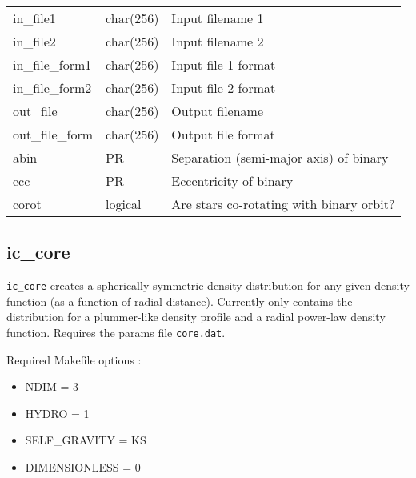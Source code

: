 \documentclass[a4paper]{article}
\newcommand{\var}[1]{\texttt{#1}}
\begin{document}
\tabletail{\hline}
\tablelasttail{\hline}
\begin{center}
\begin{supertabular}{|p{3cm}|p{2cm}|p{8cm}|}
in\_file1        & char(256) & Input filename 1 \\
in\_file2        & char(256) & Input filename 2 \\
in\_file\_form1  & char(256) & Input file 1 format \\
in\_file\_form2  & char(256) & Input file 2 format \\
out\_file        & char(256) & Output filename \\
out\_file\_form  & char(256) & Output file format \\
abin             & PR        & Separation (semi-major axis) of binary \\
ecc		 & PR        & Eccentricity of binary \\
corot            & logical   & Are stars co-rotating with binary orbit? \\
\end{supertabular}
\end{center}



\subsection{ic\_core}
\var{ic\_core} creates a spherically symmetric density distribution for any given density function (as a function of radial distance).  Currently only contains the distribution for a plummer-like density profile and a radial power-law density function.  Requires the params file \var{core.dat}. \newline

\noindent Required Makefile options :
\begin{itemize}
\item NDIM = 3
\item HYDRO = 1
\item SELF\_GRAVITY = KS
\item DIMENSIONLESS = 0
\end{itemize}

\newpage


\end{document}
